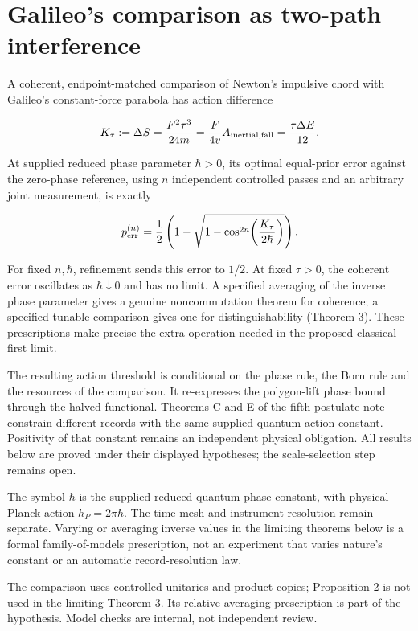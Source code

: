 \documentclass[11pt,a4paper]{article}
\begin{document}
\section{Galileo's comparison as two-path
interference}\label{galileos-comparison-as-two-path-interference}

A coherent, endpoint-matched comparison of Newton's impulsive chord with
Galileo's constant-force parabola has action difference

\[
K_\tau:=\Delta S=\frac{F^2\tau^3}{24m}
=\frac{F}{4v}A_{\rm inertial,fall}=\frac{\tau\Delta E}{12}.
\]

At supplied reduced phase parameter \(\hbar>0\), its optimal equal-prior
error against the zero-phase reference, using \(n\) independent
controlled passes and an arbitrary joint measurement, is exactly

\[
p_{\rm err}^{(n)}=\frac12\left(1-
\sqrt{1-\cos^{2n}\!\left(\frac{K_\tau}{2\hbar}\right)}\right).
\]

For fixed \(n,\hbar\), refinement sends this error to \(1/2\). At fixed
\(\tau>0\), the coherent error oscillates as \(\hbar\downarrow0\) and
has no limit. A specified averaging of the inverse phase parameter gives
a genuine noncommutation theorem for coherence; a specified tunable
comparison gives one for distinguishability (Theorem 3). These
prescriptions make precise the extra operation needed in the proposed
classical-first limit.

The resulting action threshold is conditional on the phase rule, the
Born rule and the resources of the comparison. It re-expresses the
polygon-lift phase bound through the halved functional. Theorems C and E
of the fifth-postulate note constrain different records with the same
supplied quantum action constant. Positivity of that constant remains an
independent physical obligation. All results below are proved under
their displayed hypotheses; the scale-selection step remains open.

The symbol \(\hbar\) is the supplied reduced quantum phase constant,
with physical Planck action \(h_P=2\pi\hbar\). The time mesh and
instrument resolution remain separate. Varying or averaging inverse
values in the limiting theorems below is a formal family-of-models
prescription, not an experiment that varies nature's constant or an
automatic record-resolution law.

The comparison uses controlled unitaries and product copies; Proposition
2 is not used in the limiting Theorem 3. Its relative averaging
prescription is part of the hypothesis. Model checks are internal, not
independent review.
\end{document}
